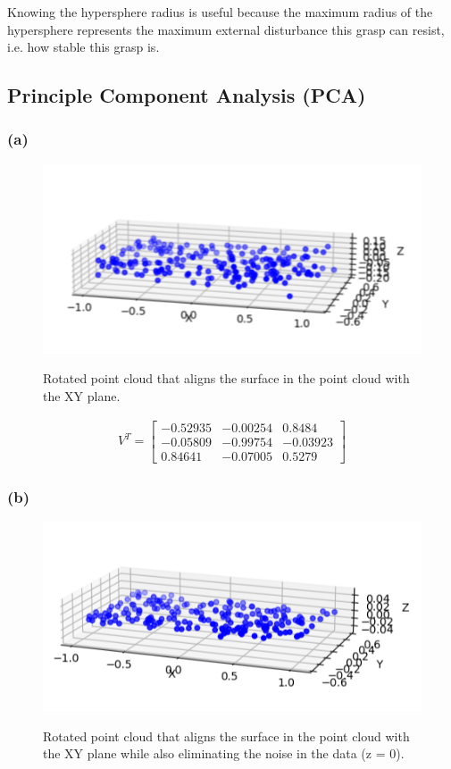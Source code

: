 \documentclass{article}
\theoremstyle{definition} %
\begin{document}
Knowing the hypersphere radius is useful because the maximum radius of the hypersphere represents the maximum external disturbance this grasp can resist, i.e. how stable this grasp is.

\subsection*{Principle Component Analysis (PCA)}

\subsubsection*{(a)}
\begin{figure}[H]
    \centering
        \textsf{\includegraphics[width=0.5\columnwidth]{pca_rotated.png}}
        \caption{Rotated point cloud that aligns the surface in the point cloud with the XY plane.}
        \label{fig:pca_rotated}
\end{figure}

\begin{align*}
	V^T = 
	\begin{bmatrix}
		-0.52935 & -0.00254 & 0.8484\\
		-0.05809 & -0.99754 & -0.03923\\
		0.84641 & -0.07005 & 0.5279
	\end{bmatrix}
\end{align*}

\subsubsection*{(b)}
\begin{figure}[H]
    \centering
        \textsf{\includegraphics[width=0.5\columnwidth]{pca_projected.png}}
        \caption{Rotated point cloud that aligns the surface in the point cloud with the XY plane while also eliminating the noise in the data (z = 0).}
        \label{fig:pca_projected}
\end{figure}
\end{document}
